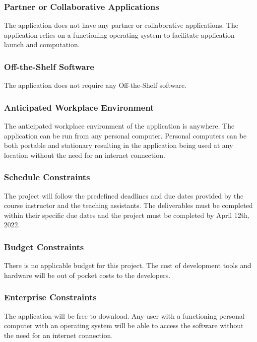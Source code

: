 \documentclass[12pt, titlepage]{article}
\begin{document}
\subsubsection{Partner or Collaborative Applications}
The application does not have any partner or collaborative applications. The application relies on a functioning operating system to facilitate application launch and computation.

\subsubsection{Off-the-Shelf Software}
The application does not require any Off-the-Shelf software.

\subsubsection{Anticipated Workplace Environment}
The anticipated workplace environment of the application is anywhere. The application can be run from any personal computer. Personal computers can be both portable and stationary resulting in the application being used at any location without the need for an internet connection. 

\subsubsection{Schedule Constraints}
The project will follow the predefined deadlines and due dates provided by the course instructor and the teaching assistants. The deliverables must be completed within their specific due dates and the project must be completed by April 12th, 2022. 

\subsubsection{Budget Constraints}
There is no applicable budget for this project. The cost of development tools and hardware will be out of pocket costs to the developers.

\subsubsection{Enterprise Constraints}
The application will be free to download. Any user with a functioning personal computer with an operating system will be able to access the software without the need for an internet connection.
\end{document}
